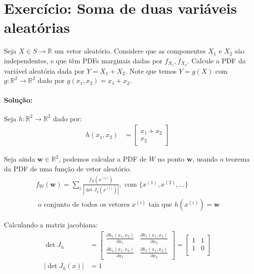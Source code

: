 \documentclass{article}
\begin{document}
\setlength{\abovedisplayskip}{12pt}
\setlength{\belowdisplayskip}{12pt}
\setlength{\abovedisplayshortskip}{0pt}
\setlength{\belowdisplayshortskip}{0pt}
\setlength{\jot}{1pt}

\section{Exercício: Soma de duas variáveis aleatórias}
Seja $X \in S \to \mathbb{R}$ um vetor aleatório. Considere que as componentes $X_1$ e $X_2$ são
independentes, e que têm PDFs marginais dadas por $f_{X_1}, f_{X_2}$. Calcule a PDF da variável
aleatória dada por $Y = X_1 + X_2$. Note que temos $Y = g(X)$ com $g: \mathbb{R}^2 \to
\mathbb{R}^2$ dado por $g(x_1,x_2) = x_1 + x_2$.

\paragraph*{Solução:}
Seja $h: \mathbb{R}^2 \to \mathbb{R}^2$ dado por:
\begin{align*}
    h(x_1, x_2) &=
    \begin{bmatrix}
        x_1 + x_2 \\ x_2
    \end{bmatrix}
\end{align*}

Seja ainda $\mathbf{w} \in \mathbb{R}^2$, podemos calcular a PDF de $W$ no ponto $\mathbf{w}$, usando
o teorema da PDF de uma função de vetor aleatório.
\begin{align*}
    f_W(\mathbf{w}) = \sum_i \frac{f_X(x^{(i)})}{|\det J_h(x^{(i)})|}, \text{ com } \{x^{(1)},
    x^{(2)}, \ldots \}\\
    \text{ o conjunto de todos os vetores } x^{(i)} \text{ tais que } h(x^{(i)}) = \mathbf{w}
\end{align*}

Calculando a matriz jacobiana:
\begin{align*}
    \det J_h &=
    \begin{bmatrix}
        \frac{\partial h_1(x_1,x_2)}{\partial x_1} & \frac{\partial h_1(x_1,x_2)}{\partial x_2} \\
        \frac{\partial h_1(x_1,x_2)}{\partial x_1} & \frac{\partial h_1(x_1,x_2)}{\partial x_2}
    \end{bmatrix} =
    \begin{bmatrix}
        1 & 1 \\
        1 & 0 \\
    \end{bmatrix} \\
    |\det J_h(x)| &= 1
\end{align*}
\end{document}
